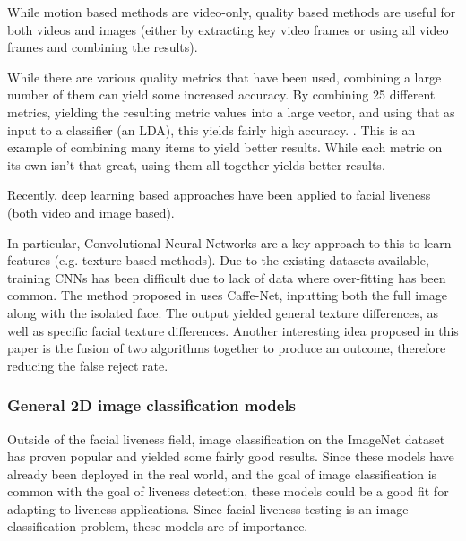 \documentclass[11pt,a4paper]{article}
\begin{document}
        While motion based methods are video-only, quality based methods are useful for both videos and images (either by extracting key video frames or using all video frames and combining the results).

        While there are various quality metrics that have been used, combining a large number of them can yield some increased accuracy. By combining 25 different metrics,
        yielding the resulting metric values into a large vector, and using that as input to a classifier (an LDA), this yields fairly high accuracy. \cite{ImageQualityAssessmentTest}.
        This is an example of combining many items to yield better results. While each metric on its own isn't that great, using them all together yields better results.
        
        Recently, deep learning based approaches have been applied to facial liveness (both video and image based).

        In particular, Convolutional Neural Networks are a key approach to this to learn features (e.g. texture based methods).
        Due to the existing datasets available, training CNNs has been difficult due to lack of data where over-fitting has been common.
        The method proposed in \cite{Patel2016CrossDatabaseFA} uses Caffe-Net, inputting both the full image along with the isolated face.
        The output yielded general texture differences, as well as specific facial texture differences. Another interesting idea proposed
        in this paper is the fusion of two algorithms together to produce an outcome, therefore reducing the false reject rate.
        
        \subsubsection{General 2D image classification models}
        Outside of the facial liveness field, image classification on the ImageNet dataset has proven popular and yielded some fairly good
        results. Since these models have already been deployed in the real world, and the goal of image classification is common with the
        goal of liveness detection, these models could be a good fit for adapting to liveness applications. Since facial liveness testing is
        an image classification problem, these models are of importance.
        
\end{document}
